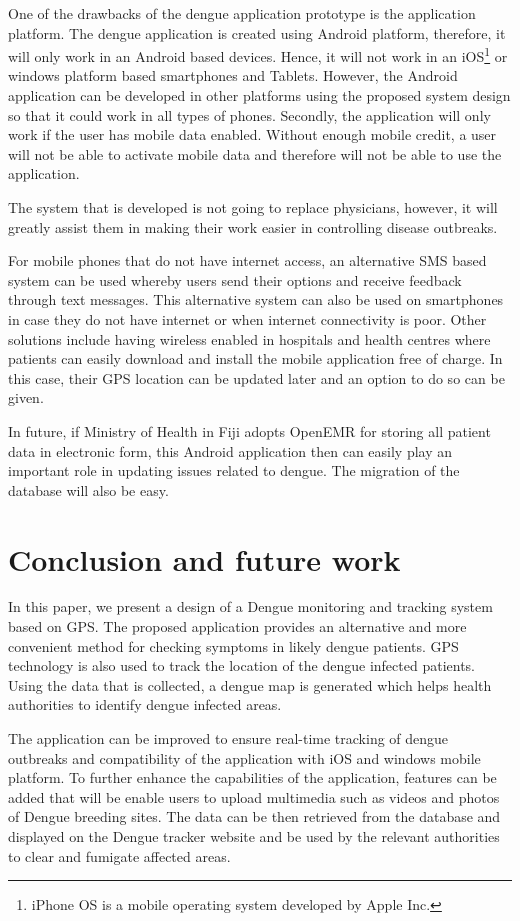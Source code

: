 \documentclass[runningheads,a4paper]{llncs}
\begin{document}
One of the drawbacks of the dengue application prototype is the application platform. The dengue application is created using Android platform, therefore, it will only work in an Android based devices. Hence, it will not work in an iOS\footnote{iPhone OS is a mobile operating system developed by Apple Inc.} or windows platform based smartphones and Tablets. However, the Android application can be developed in other platforms using the proposed system design so that it could work in all types of phones. Secondly, the application will only work if the user has mobile data enabled. Without enough mobile credit, a user will not be able to activate mobile data and therefore will not be able to use the application.

The system that is developed is not going to replace physicians, however, it will greatly assist them in making their work easier in controlling disease outbreaks.

For mobile phones that do not have internet access, an alternative SMS based system can be used whereby users send their options and receive feedback through text messages. This alternative system can also be used on smartphones in case they do not have internet or when internet connectivity is poor. Other solutions include having wireless enabled in hospitals and health centres where patients can easily download and install the mobile application free of charge. In this case, their GPS location can be updated later and an option to do so can be given.

In future, if Ministry of Health in Fiji adopts OpenEMR for storing all patient data in electronic form, this Android application then can easily play an important role in updating issues related to dengue. The migration of the database will also be easy. 

\section{Conclusion and future work}
In this paper, we present a design of a Dengue monitoring and tracking system based on GPS. The proposed application provides an alternative and more convenient method for checking symptoms in likely dengue patients. GPS technology is also used to track the location of the dengue infected patients. Using the data that is collected, a dengue map is generated which helps health authorities to identify dengue infected areas. 

 The application can be improved to ensure real-time tracking of dengue outbreaks and compatibility of the application with iOS and windows mobile platform. To further enhance the capabilities of the application, features can be added that will be enable users to upload multimedia such as videos and photos  of Dengue breeding sites. The data can be then retrieved from the database and displayed on the Dengue tracker website and be used by the relevant authorities to clear and fumigate affected areas. 
\end{document}

